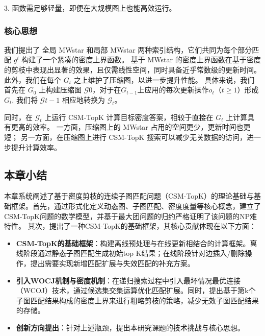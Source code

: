 	3.	函数需足够轻量，即便在大规模图上也能高效运行。

\subsubsection{核心思想}

我们提出了 全局 MWstar 和局部 MWstar 两种索引结构，它们共同为每个部分匹配 $g^i$ 构建了一个紧凑的密度上界函数。
基于 MWstar 的密度上界函数在基于密度的剪枝中表现出显著的效果，且仅需线性空间，同时具备近乎常数级的更新时间。
此外，我们在每个 $G_t$ 之上维护了压缩图，以进一步提升性能。
具体来说，我们首先在 $G_0$ 上构建压缩图 $\mathcal{G}0$，对于在$G_{t-1}$上应用的每次更新操作$o_t$（$t \geq 1$）形成$G_t$,
我们将 $\mathcal{G}{t-1}$ 相应地转换为 $\mathcal{G}_t$。

同时，在 $\mathcal{G}_t$ 上运行 CSM-TopK 计算目标密度答案，相较于直接在 $G_t$ 上计算具有更高的效率。
一方面，压缩图上的 MWstar 占用的空间更少，更新时间也更短；
另一方面，在压缩图上进行 CSM-TopK 搜索可以减少无关数据的访问，进一步提升计算效率。
\subsection{本章小结}
本章系统阐述了基于密度剪枝的连续子图匹配问题（CSM-TopK）的理论基础与基础框架。首先，通过形式化定义动态图、子图匹配、密度度量等核心概念，建立了CSM-TopK问题的数学模型，并基于最大团问题的归约严格证明了该问题的NP难特性。
其次，提出了一种CSM-TopK的基础框架，其核心贡献体现在以下方面：
\begin{itemize}
\item \textbf{CSM-TopK的基础框架}：构建离线预处理与在线更新相结合的计算框架。离线阶段通过静态子图匹配生成初始top K结果；在线阶段针对边插入/删除操作，提出需要实现新增匹配扩展与失效匹配的补充方案。

\item \textbf{引入WOCJ机制与密度机制}：在递归搜索过程中引入最坏情况最优连接（WCOJ）技术，通过候选集交集运算优化匹配扩展。同时，提出基于第k个子图匹配结果构成的密度上界来进行粗略剪枝的策略，减少无效子图匹配结果的存储。

\item \textbf{创新方向提出}：针对上述瓶颈，提出本研究课题的技术挑战与核心思想。
\end{itemize}    
